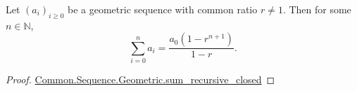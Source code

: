\documentclass{article}
\begin{document}
\begin{theorem}

Let $(a_i)_{i \geq 0}$ be a geometric sequence with common ratio $r \neq 1$.
Then for some $n \in \mathbb{N}$,
$$\sum_{i=0}^n a_i = \frac{a_0(1 - r^{n+1})}{1 - r}.$$

\end{theorem}

\begin{proof}

\href{Geometric.lean}{Common.Sequence.Geometric.sum_recursive_closed}

\end{proof}
\end{document}
